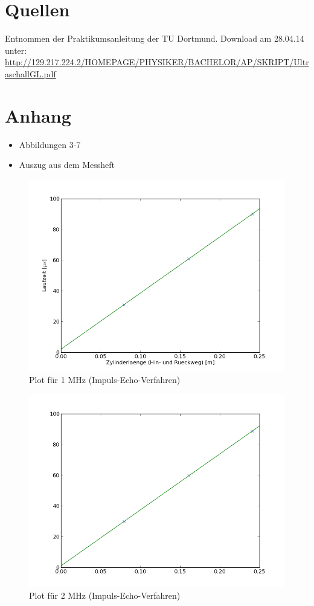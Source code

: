 \documentclass[11pt,ngerman,a4paper]{article}
\begin{document}
\section{Quellen}
\begin{enumerate}[{[}1{]}]
\item Entnommen der Praktikumsanleitung \textit{} der TU Dortmund. Download am 28.04.14 unter:\\
 \url{http://129.217.224.2/HOMEPAGE/PHYSIKER/BACHELOR/AP/SKRIPT/UltraschallGL.pdf}
\end{enumerate}

\section{Anhang}
\begin{itemize}
\item Abbildungen 3-7
\item Auszug aus dem Messheft
\end{itemize}
\newpage
\begin{figure}[h]
\includegraphics[width=12cm]{Fig1.png}
\caption{Plot für 1 MHz (Impuls-Echo-Verfahren)}
\label{fig1}
\end{figure}
\newpage
\begin{figure}[h]
\includegraphics[width=12cm]{Fig2.png}
\caption{Plot für 2 MHz (Impuls-Echo-Verfahren)}
\label{fig2}
\end{figure}
\end{document}
